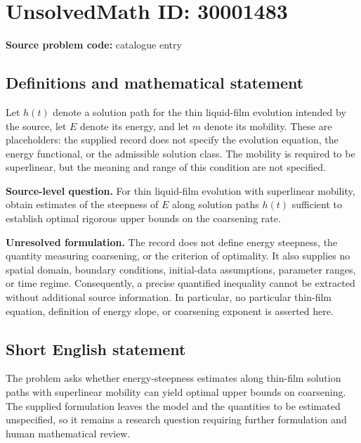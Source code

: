 \documentclass[11pt]{article}
\begin{document}
\section*{UnsolvedMath ID: 30001483}
\textbf{Source problem code:} catalogue entry
\subsection{Definitions and mathematical statement}
Let \(h(t)\) denote a solution path for the thin liquid-film evolution intended by the source, let \(E\) denote its energy, and let \(m\) denote its mobility. These are placeholders: the supplied record does not specify the evolution equation, the energy functional, or the admissible solution class. The mobility is required to be superlinear, but the meaning and range of this condition are not specified.

\textbf{Source-level question.} For thin liquid-film evolution with superlinear mobility, obtain estimates of the steepness of \(E\) along solution paths \(h(t)\) sufficient to establish optimal rigorous upper bounds on the coarsening rate.

\textbf{Unresolved formulation.} The record does not define energy steepness, the quantity measuring coarsening, or the criterion of optimality. It also supplies no spatial domain, boundary conditions, initial-data assumptions, parameter ranges, or time regime. Consequently, a precise quantified inequality cannot be extracted without additional source information. In particular, no particular thin-film equation, definition of energy slope, or coarsening exponent is asserted here.
\subsection{Short English statement}
The problem asks whether energy-steepness estimates along thin-film solution paths with superlinear mobility can yield optimal upper bounds on coarsening. The supplied formulation leaves the model and the quantities to be estimated unspecified, so it remains a research question requiring further formulation and human mathematical review.
\end{document}
